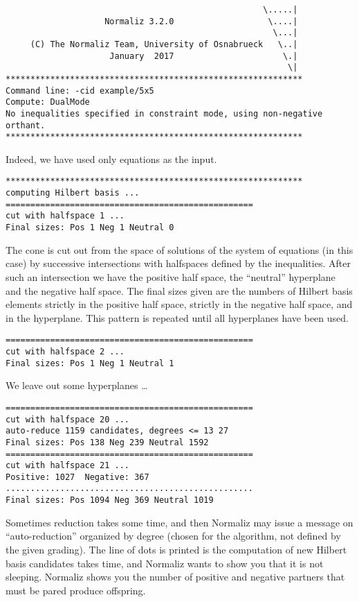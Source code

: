 \begin{Verbatim}
                                                    \.....|
                    Normaliz 3.2.0                   \....|
                                                      \...|
     (C) The Normaliz Team, University of Osnabrueck   \..|
                     January  2017                      \.|
                                                         \|
************************************************************
Command line: -cid example/5x5 
Compute: DualMode 
No inequalities specified in constraint mode, using non-negative orthant.
************************************************************
\end{Verbatim}
Indeed, we have used only equations as the input.
\begin{Verbatim}
************************************************************
computing Hilbert basis ...
==================================================
cut with halfspace 1 ...
Final sizes: Pos 1 Neg 1 Neutral 0
\end{Verbatim}
The cone is cut out from the space of solutions of the system of equations (in this case) by successive intersections with halfspaces defined by the inequalities. After such an intersection we have the positive half space, the ``neutral'' hyperplane and the negative half space. The final sizes given are the numbers of Hilbert basis elements strictly in the positive half space, strictly in the negative half space, and in the hyperplane. This pattern is repeated until all hyperplanes have been used.
\begin{Verbatim}
==================================================
cut with halfspace 2 ...
Final sizes: Pos 1 Neg 1 Neutral 1
\end{Verbatim}
We leave out some hyperplanes \dots
\begin{Verbatim}
==================================================
cut with halfspace 20 ...
auto-reduce 1159 candidates, degrees <= 13 27 
Final sizes: Pos 138 Neg 239 Neutral 1592
==================================================
cut with halfspace 21 ...
Positive: 1027  Negative: 367
..................................................
Final sizes: Pos 1094 Neg 369 Neutral 1019
\end{Verbatim}
Sometimes reduction takes some time, and then Normaliz may issue a message on ``auto-reduction'' organized by degree (chosen for the algorithm, not defined by the given grading). The line of dots is printed is the computation of new Hilbert basis candidates takes time, and Normaliz wants to show you that it is not sleeping. Normaliz shows you the number of positive and negative partners that must be pared produce offspring.
